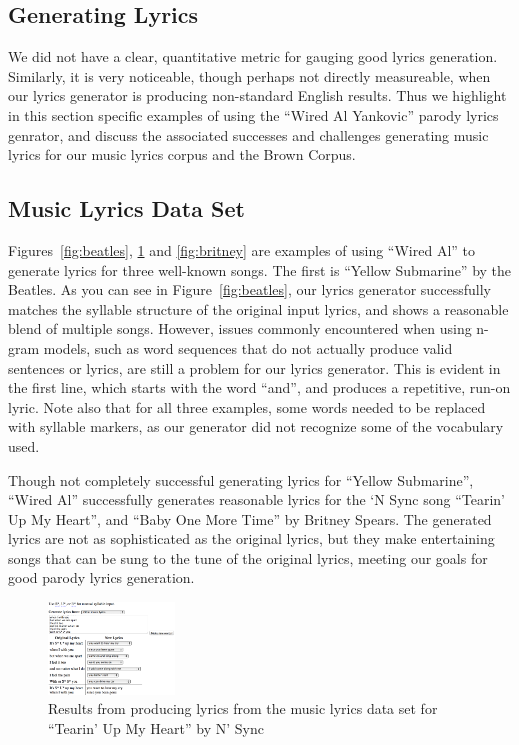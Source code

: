 \documentclass{vgtc}                          %
\begin{document}

\subsection{Generating Lyrics}
We did not have a clear, quantitative metric for gauging good lyrics
generation. Similarly, it is very noticeable, though perhaps not directly
measureable, when our lyrics generator is producing non-standard
English results. Thus we highlight in this section specific examples
of using the ``Wired Al Yankovic'' parody
lyrics genrator, and discuss the associated successes and
challenges generating music lyrics for our music lyrics corpus
and the Brown Corpus.

\subsection{Music Lyrics Data Set}
Figures~\ref{fig:beatles}, \ref{fig:nsync} and \ref{fig:britney}
are examples of using ``Wired Al'' to generate lyrics for
three well-known songs. The first is
``Yellow Submarine'' by the Beatles. As you can see in
Figure~\ref{fig:beatles}, our lyrics generator successfully
matches the syllable structure of the original input lyrics,
and shows a reasonable blend of multiple songs. However,
issues commonly encountered when using n-gram models,
such as word sequences that do not actually produce
valid sentences or lyrics, are still a problem
for our lyrics generator. This is evident in the
first line, which starts with the word ``and'',
and produces a repetitive, run-on lyric. Note also that for
all three examples, some words needed to be replaced with
syllable markers, as our generator did not recognize
some of the vocabulary used.

Though not completely successful generating lyrics for
``Yellow Submarine'', ``Wired Al'' successfully generates
reasonable lyrics for the `N Sync song ``Tearin' Up My
Heart'', and ``Baby One More Time'' by Britney Spears.
The generated lyrics are not as sophisticated as the
original lyrics, but they make entertaining songs
that can be sung to the tune of the original lyrics,
meeting our goals for good parody lyrics generation.

\begin{figure}[t]
\centering
\includegraphics[width=0.3\textwidth]{images/png/tumh3.png}
\caption{Results from producing lyrics from the music lyrics data set for ``Tearin' Up My Heart'' by
N' Sync}
\label{fig:nsync}
\end{figure}
\end{document}
